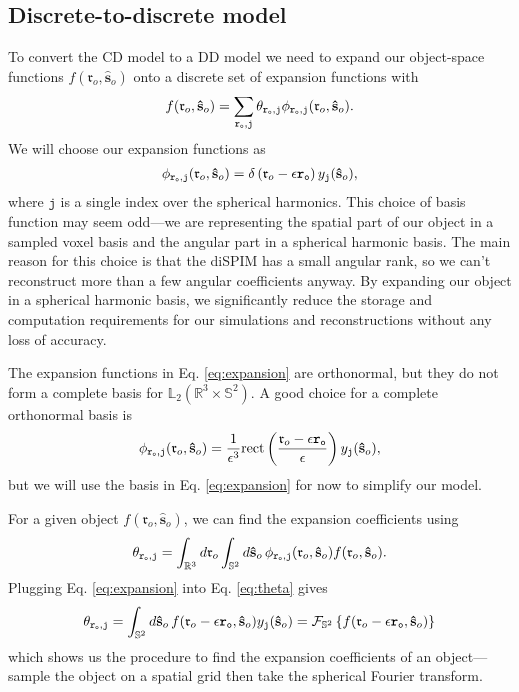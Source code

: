 \documentclass[11pt]{article}
\providecommand{\mc}[1]{\mathcal{#1}}
\providecommand{\ro}{\mathbf{\mathfrak{r}}_o}
\providecommand{\so}{\mathbf{\hat{s}}_o}
\providecommand{\mbb}[1]{\mathbb{#1}}
\providecommand{\tb}[1]{\textbf{#1}}
\providecommand{\ttt}[1]{\texttt{#1}}
\providecommand{\intr}[1]{\int_{\mbb{R}^{#1}}}
\providecommand{\ints}[1]{\int_{\mbb{S}^{#1}}}
\begin{document}
\subsection{Discrete-to-discrete model}
To convert the CD model to a DD model we need to expand our object-space
functions $f(\ro, \so)$ onto a discrete set of expansion functions with
\begin{align}
  f(\ro, \so) = \sum_{\ttt{\tb{r}}_{\ttt{o}},\ttt{j}} \theta_{\ttt{\tb{r}}_{\ttt{o}},\ttt{j}} \phi_{\ttt{\tb{r}}_{\ttt{o}},\ttt{j}}(\ro, \so).  \label{eq:exp}
\end{align}
We will choose our expansion functions as
\begin{align}
  \phi_{\ttt{\tb{r}}_{\ttt{o}},\ttt{j}}(\ro, \so) = \delta\left(\ro - \epsilon\ttt{\tb{r}}_{\ttt{o}}\right)y_{\ttt{j}}(\so), \label{eq:expansion}
\end{align}
where $\ttt{j}$ is a single index over the spherical harmonics. This choice of
basis function may seem odd---we are representing the spatial part of our object
in a sampled voxel basis and the angular part in a spherical harmonic basis. The
main reason for this choice is that the diSPIM has a small angular rank, so we
can't reconstruct more than a few angular coefficients anyway. By expanding our
object in a spherical harmonic basis, we significantly reduce the storage and
computation requirements for our simulations and reconstructions without any
loss of accuracy.

The expansion functions in Eq. \ref{eq:expansion} are orthonormal, but they do
not form a complete basis for $\mbb{L}_2(\mbb{R}^3\times \mbb{S}^2)$. A good
choice for a complete orthonormal basis is
\begin{align}
  \phi_{\ttt{\tb{r}}_{\ttt{o}},\ttt{j}}(\ro, \so) = \frac{1}{\epsilon^3}\text{rect}\left(\frac{\ro - \epsilon\ttt{\tb{r}}_{\ttt{o}}}{\epsilon}\right)y_{\ttt{j}}(\so), 
\end{align}
but we will use the basis in Eq. \ref{eq:expansion} for now to simplify our
model.

For a given object $f(\ro, \so)$, we can find the expansion coefficients using
\begin{align}
  \theta_{\ttt{\tb{r}}_{\ttt{o}},\ttt{j}} = \intr{3}d\ro\ints{2}d\so\, \phi_{\ttt{\tb{r}}_{\ttt{o}},\ttt{j}}(\ro, \so)f(\ro, \so). \label{eq:theta}
\end{align}
Plugging Eq. \ref{eq:expansion} into Eq. \ref{eq:theta} gives 
\begin{align}
  \theta_{\ttt{\tb{r}}_{\ttt{o}},\ttt{j}} = \ints{2}d\so\, f(\ro - \epsilon\ttt{\tb{r}}_{\ttt{o}},\so)y_{\ttt{j}}(\so) = \mc{F}_{\mbb{S}^2}\left\{f(\ro - \epsilon\ttt{\tb{r}}_{\ttt{o}},\so)\right\} \label{eq:f2sh}
\end{align}
which shows us the procedure to find the expansion coefficients of an
object---sample the object on a spatial grid then take the spherical Fourier
transform.
\end{document}
